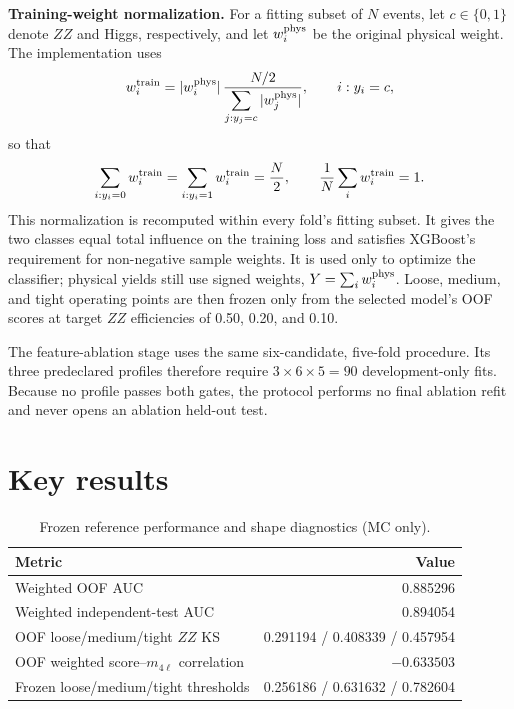 \documentclass[11pt,a4paper]{article}
\begin{document}
\textbf{Training-weight normalization.} For a fitting subset of $N$ events, let $c\in\{0,1\}$ denote $ZZ$ and Higgs, respectively, and let $w_i^{\rm phys}$ be the original physical weight. The implementation uses
\begin{equation}
w_i^{\rm train}
=|w_i^{\rm phys}|\,
\frac{N/2}{\displaystyle\sum_{j:y_j=c}|w_j^{\rm phys}|},
\qquad i:y_i=c,
\end{equation}
so that
\begin{equation}
\sum_{i:y_i=0}w_i^{\rm train}
=\sum_{i:y_i=1}w_i^{\rm train}=\frac{N}{2},
\qquad
\frac{1}{N}\sum_i w_i^{\rm train}=1.
\end{equation}
This normalization is recomputed within every fold's fitting subset. It gives the two classes equal total influence on the training loss and satisfies XGBoost's requirement for non-negative sample weights. It is used only to optimize the classifier; physical yields still use signed weights, $Y=\sum_i w_i^{\rm phys}$. Loose, medium, and tight operating points are then frozen only from the selected model's OOF scores at target $ZZ$ efficiencies of 0.50, 0.20, and 0.10.

The feature-ablation stage uses the same six-candidate, five-fold procedure. Its three predeclared profiles therefore require $3\times6\times5=90$ development-only fits. Because no profile passes both gates, the protocol performs no final ablation refit and never opens an ablation held-out test.

\section{Key results}

\begin{table}[ht]
\centering
\caption{Frozen reference performance and shape diagnostics (MC only).}
\begin{tabular}{lr}
\toprule
Metric & Value\\
\midrule
Weighted OOF AUC & 0.885296\\
Weighted independent-test AUC & 0.894054\\
OOF loose/medium/tight $ZZ$ KS & 0.291194 / 0.408339 / 0.457954\\
OOF weighted score--$m_{4\ell}$ correlation & $-0.633503$\\
Frozen loose/medium/tight thresholds & 0.256186 / 0.631632 / 0.782604\\
\bottomrule
\end{tabular}
\end{table}
\end{document}
